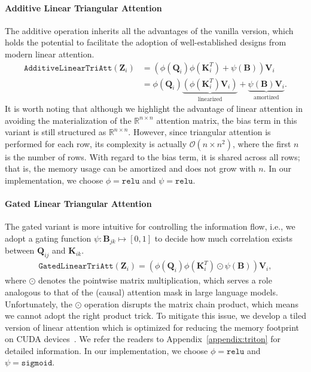 \paragraph{Additive Linear Triangular Attention} The additive operation inherits all the advantages of the vanilla version, which holds the potential to facilitate the adoption of well-established designs from modern linear attention. 
\begin{align}
    \mathtt{AdditiveLinearTriAtt}(\mathbf{Z}_i) & = \left(\phi(\mathbf{Q}_i)\phi(\mathbf{K}_i^T)+\psi(\mathbf{B})\right)\mathbf{V}_i \\
    & = \phi(\mathbf{Q}_i)\underbrace{\left(\phi(\mathbf{K}_i^T)\mathbf{V}_i\right)}_{\text{linearized}} +\underbrace{\psi(\mathbf{B})\mathbf{V}_i}_{\text{amortized}}.
\end{align}
It is worth noting that although we highlight the advantage of linear attention in avoiding the materialization of the $\mathbb{R}^{n\times n}$ attention matrix, the bias term in this variant is still structured as $\mathbb{R}^{n\times n}$. However, since triangular attention is performed for each row, its complexity is actually $\mathcal{O}(n\times n^2)$, where the first $n$ is the number of rows. With regard to the bias term, it is shared across all rows; that is, the memory usage can be amortized and does not grow with $n$. In our implementation, we choose $\phi=\mathtt{relu}$ and $\psi=\mathtt{relu}$.

\paragraph{Gated Linear Triangular Attention} The gated variant is more intuitive for controlling the information flow, i.e., we adopt a gating function $\psi:\mathbf{B}_{jk}\mapsto[0,1]$ to decide how much correlation exists between $\mathbf{Q}_{ij}$ and $\mathbf{K}_{ik}$.
\begin{align}
    \mathtt{GatedLinearTriAtt}(\mathbf{Z}_i) = \left(\phi(\mathbf{Q}_i)\phi(\mathbf{K}_i^T)\odot\psi(\mathbf{B})\right)\mathbf{V}_i, 
\end{align}
where $\odot$ denotes the pointwise matrix multiplication, which serves a role analogous to that of the (causal) attention mask in large language models. Unfortunately, the $\odot$ operation disrupts the matrix chain product, which means we cannot adopt the right product trick. To mitigate this issue, we develop a tiled version of linear attention which is optimized for reducing the memory footprint on CUDA devices~\cite{dao2022flashattentionfastmemoryefficientexact,Atkinson2025latkins,Geiger2025NVIDIA}. We refer the readers to Appendix~\ref{appendix:triton} for detailed information. In our implementation, we choose $\phi=\mathtt{relu}$ and $\psi=\mathtt{sigmoid}$.


